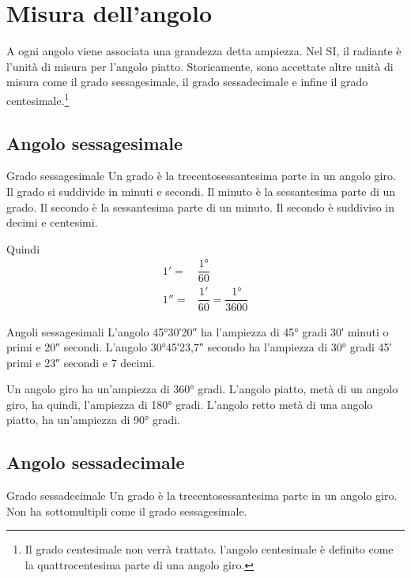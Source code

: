 \section{Misura dell'angolo}
\label{sec:MisuraAngoloGonio}
A ogni angolo viene associata una grandezza detta ampiezza. Nel SI, il radiante è l'unità di misura per l'angolo piatto.
Storicamente, sono accettate altre unità di misura come il grado sessagesimale, il grado sessadecimale  e infine il grado centesimale.\footnote{Il grado centesimale non verrà trattato. l'angolo centesimale è definito come la quattrocentesima parte di una angolo giro.}
\subsection{Angolo sessagesimale}
\begin{definizionet}{Grado sessagesimale}{}
	Un grado è la trecentosessantesima parte in un angolo giro. Il grado si suddivide in minuti e secondi. Il minuto è la sessantesima parte di un grado. Il secondo è la sessantesima parte di un minuto. Il secondo è suddiviso in decimi e centesimi.
\end{definizionet}
Quindi
\begin{align*}
\ang{;1;}=&\dfrac{\ang{1}}{60}\\
\ang{;;1}=&\dfrac{\ang{;1;}}{60}=\dfrac{\ang{1}}{3600}
\end{align*}
\begin{esempiot}{Angoli sessagesimali}{}
	L'angolo \ang{45;30;20} ha l'ampiezza di \ang{45} gradi \ang{;30;} minuti o primi e \ang{;;20} secondi. L'angolo \ang{30;45;23,7} secondo ha l'ampiezza di \ang{30} gradi \ang{;45;} primi e \ang{;;23} secondi e $7$ decimi.
\end{esempiot}
Un angolo giro ha un'ampiezza di \ang{360} gradi. L'angolo piatto, metà di un angolo giro, ha quindi, l'ampiezza di \ang{180} gradi. L'angolo retto metà di una angolo piatto, ha un'ampiezza di \ang{90} gradi.
\subsection{Angolo sessadecimale}
\begin{definizionet}{Grado sessadecimale}{}
	Un grado è la trecentosessantesima parte in un angolo giro. Non ha sottomultipli come il grado sessagesimale.
\end{definizionet}


